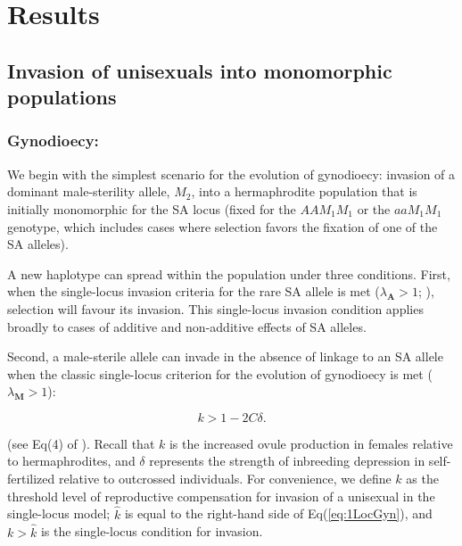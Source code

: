 \documentclass{article}
\begin{document}
\section*{Results}

\subsection*{Invasion of unisexuals into monomorphic populations}

\subsubsection*{Gynodioecy:} We begin with the simplest scenario for the evolution of gynodioecy: invasion of a dominant male-sterility allele, $M_2$, into a hermaphrodite population that is initially monomorphic for the SA locus (fixed for the $AAM_1M_1$ or the $aaM_1M_1$ genotype, which includes cases where selection favors the fixation of one of the SA alleles).  

A new haplotype can spread within the population under three conditions. First, when the single-locus invasion criteria for the rare SA allele is met ($\lambda_{\mathbf{A}} > 1$; \citealt{Kidwell1977, JordanConnallon2014, Olito2017}), selection will favour its invasion. This single-locus invasion condition applies broadly to cases of additive and non-additive effects of SA alleles.

Second, a male-sterile allele can invade in the absence of linkage to an SA allele when the classic single-locus criterion for the evolution of gynodioecy is met ($\lambda_{\mathbf{M}} > 1$):

\begin{equation}\label{eq:1LocGyn}
	k > 1 - 2 C \delta.
\end{equation}

\noindent (see Eq(4) of \citealt{Charlesworth1978a}). Recall that $k$ is the increased ovule production in females relative to hermaphrodites, and $\delta$ represents the strength of inbreeding depression in self-fertilized relative to outcrossed individuals. For convenience, we define $\hat{k}$ as the threshold level of reproductive compensation for invasion of a unisexual in the single-locus model; $\hat{k}$ is equal to the right-hand side of Eq(\ref{eq:1LocGyn}), and $k > \hat{k}$ is the single-locus condition for invasion.
\end{document}

